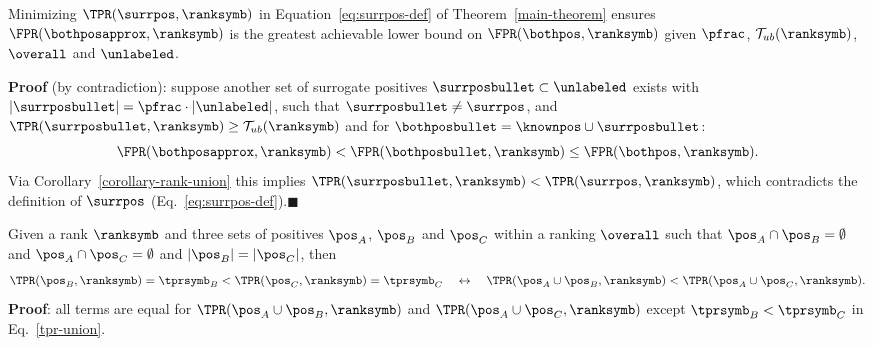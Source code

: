 \begin{lemma} \label{lemma-glb}
Minimizing $\TPR(\surrpos, \ranksymb)$ in Equation~\eqref{eq:surrpos-def} of Theorem~\ref{main-theorem} ensures $\FPR(\bothposapprox, \ranksymb)$ is the greatest achievable lower bound on $\FPR(\bothpos, \ranksymb)$ given $\pfrac$, $\mathcal{T}_{ub}(\ranksymb)$, $\overall$ and $\unlabeled$. 

\textbf{Proof} (by contradiction): suppose another set of surrogate positives $\surrposbullet \subset \unlabeled$ exists with $|\surrposbullet|=\pfrac\cdot|\unlabeled|$, such that $\surrposbullet\neq\surrpos$, and $\TPR(\surrposbullet,\ranksymb) \geq \mathcal{T}_{ub}(\ranksymb)$ and for $\bothposbullet = \knownpos\cup\surrposbullet$: 
\begin{equation*}
\FPR(\bothposapprox,\ranksymb) < \FPR(\bothposbullet,\ranksymb) \leq \FPR(\bothpos,\ranksymb).
\end{equation*}
Via Corollary~\ref{corollary-rank-union} this implies $\TPR(\surrposbullet,\ranksymb) < \TPR(\surrpos,\ranksymb)$, which contradicts the definition of $\surrpos$ (Eq.~\eqref{eq:surrpos-def}).\hfill$\blacksquare$
\end{lemma}

\begin{corollary} \label{corollary-rank-union}
Given a rank $\ranksymb$ and three sets of positives $\pos_A$, $\pos_B$ and $\pos_C$ within a ranking $\overall$ such that $\pos_A\cap\pos_B=\emptyset$ and $\pos_A\cap\pos_C=\emptyset$ and $|\pos_B|=|\pos_C|$, then
\begin{equation*}
\TPR(\pos_B,\ranksymb) = \tprsymb_B < \TPR(\pos_C,\ranksymb) = \tprsymb_C \quad\leftrightarrow\quad \TPR(\pos_A\cup \pos_B,\ranksymb) < \TPR(\pos_A\cup\pos_C,\ranksymb).
\end{equation*}
\textbf{Proof}: all terms are equal for $\TPR(\pos_A\cup \pos_B,\ranksymb)$ and $\TPR(\pos_A\cup \pos_C,\ranksymb)$ except $\tprsymb_B < \tprsymb_C$ in Eq.~\eqref{tpr-union}.
\end{corollary}

